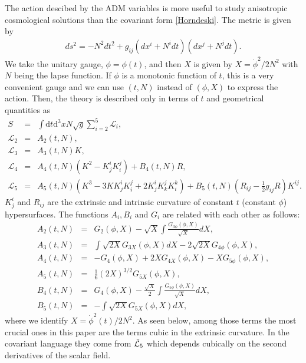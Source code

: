 \documentclass[aps,prd,preprint,superscriptaddress,nofootinbib,tightenlines]{revtex4-1}
\begin{document}
The action descibed by the ADM variables
is more useful to study anisotropic cosmological solutions
than the covariant form \eqref{Horndeski}.
The metric is given by
\begin{eqnarray}
ds^2 = -N^2 dt^2 + g_{ij} (dx^i+N^i dt) (dx^j+N^j dt) .
\end{eqnarray}
We take the unitary gauge, $\phi=\phi(t)$, and
then $X$ is given by $X=\dot\phi^2/2N^2$ with $N$ being the lapse function.
If $\phi$ is a monotonic function of $t$,
this is a very convenient gauge and we can use $(t, N)$
instead of $(\phi,X)$ to express the action.
Then, the theory is described only in terms of
$t$ and
geometrical quantities as
\begin{eqnarray}
S&=&\int \mathrm{d}t \mathrm{d}^3x N \sqrt{g} \sum_{i=2}^{5} \mathcal{L}_i ,\label{ADM}\\
\mathcal{L}_2&=&A_2(t,N),\label{admL2}\\
\mathcal{L}_3&=&A_3(t,N){K},\\
\mathcal{L}_4&=&A_4(t,N)\left({K}^2-{K}^i_j{K}^j_i\right)+B_4(t,N){R},\\
\mathcal{L}_5&=&A_5(t,N)\left({K}^3-3{K}{K}^i_j{K}^j_i+2{K}^i_j{K}^j_k{K}^k_i\right)
+B_5(t,N)\left({R}_{ij}-\frac{1}{2}g_{ij}{R}\right){K}^{ij} .\label{admL5}
\end{eqnarray}
$K^i_j$ and $R_{ij}$ are the extrinsic and intrinsic curvature
of constant $t$ (constant $\phi$) hypersurfaces.
The functions $A_i, B_i$ and $G_i$
are related with each other as follows:
\begin{eqnarray}
A_2(t,N) &=& G_2(\phi,X) - \sqrt{X} \int \frac{G_{3\phi}(\phi,X)}{\sqrt{X}} dX, \\
A_3(t,N) &=& \int \sqrt{2X} G_{3X}(\phi,X)  dX - 2 \sqrt{2X} G_{4\phi}(\phi,X), \\
A_4(t,N) &=& - G_4(\phi,X)  + 2X G_{4X}(\phi,X)  - XG_{5\phi}(\phi,X) ,\label{defA4} \\
A_5(t,N) &=& \frac{1}{6} (2X)^{3/2} G_{5X}(\phi,X) , \\
B_4(t,N) &=& G_4(\phi,X)  - \frac{\sqrt{X}}{2} \int \frac{G_{5\phi}(\phi,X) }{\sqrt{X}} dX, \\
B_5(t,N) &=& - \int \sqrt{2X} G_{5X}(\phi,X)  dX\label{defB5},
\end{eqnarray}
where we identify $X=\dot\phi^2(t)/2N^2$.
As seen below, among those terms the most crucial ones in this paper are
the terms cubic in the extrinsic curvature.
In the covariant language they come from $\tilde{{\cal L}}_5$
which depends cubically on the second derivatives of the scalar field.
\end{document}
